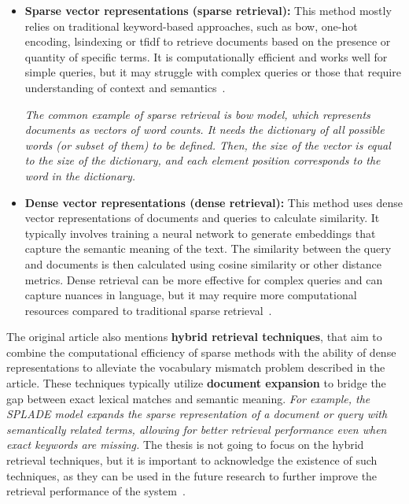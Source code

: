 \begin{itemize}
  \item \textbf{Sparse vector representations (sparse retrieval):} This method
      mostly relies on traditional keyword-based approaches, such as \gls{bow},
        one-hot encoding, \gls{lsindexing} or \gls{tfidf} to retrieve documents
        based on the presence or quantity of specific terms. It is
        computationally efficient and works well for simple queries, but it may
        struggle with complex queries or those that require understanding of
        context and semantics~\cite{khan2026retrieval}.

        \textsl{The common example of sparse retrieval is \gls{bow} model, which
        represents documents as vectors of word counts. It needs the dictionary
        of all possible words (or subset of them) to be defined. Then, the size
        of the vector is equal to the size of the dictionary, and each element
        position corresponds to the word in the dictionary.}

  \item \textbf{Dense vector representations (dense retrieval):} This method
      uses dense vector representations of documents and queries to calculate
        similarity. It typically involves training a neural network to generate
        embeddings that capture the semantic meaning of the text. The similarity
        between the query and documents is then calculated using cosine
        similarity or other distance metrics. Dense retrieval can be more
        effective for complex queries and can capture nuances in language, but
        it may require more computational resources compared to traditional
        sparse retrieval~\cite{khan2026retrieval}.
\end{itemize}

The original article also mentions \textbf{hybrid retrieval techniques}, that
aim to combine the computational efficiency of sparse methods with the ability
of dense representations to alleviate the vocabulary mismatch problem described
in the article. These techniques typically utilize \textbf{document expansion}
to bridge the gap between exact lexical matches and semantic meaning.
\textsl{For example, the SPLADE model expands the sparse representation of a
document or query with semantically related terms, allowing for better retrieval
performance even when exact keywords are missing.} The thesis is not going to
focus on the hybrid retrieval techniques, but it is important to acknowledge the
existence of such techniques, as they can be used in the future research to
further improve the retrieval performance of the system~\cite{khan2026retrieval}.

